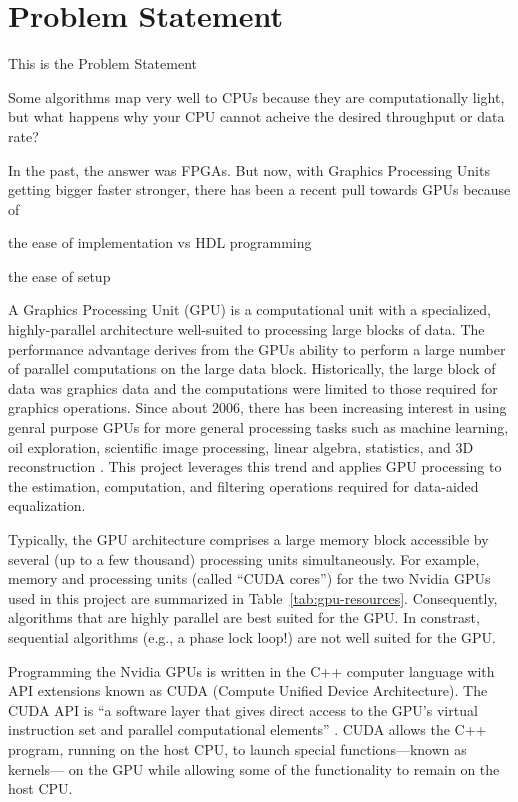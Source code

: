 \chapter{Problem Statement}
This is the Problem Statement

Some algorithms map very well to CPUs because they are computationally light,
but what happens why your CPU cannot acheive the desired throughput or data rate?

In the past, the answer was FPGAs. But now, with Graphics Processing Units getting bigger faster stronger, there has been a recent pull towards GPUs because of

the ease of implementation vs HDL programming

the ease of setup


A Graphics Processing Unit (GPU) is a computational unit with a specialized, highly-parallel architecture well-suited to processing large blocks of data.
The performance advantage derives from the GPUs ability to perform a large number of parallel computations on the large data block.
Historically, the large block of data was graphics data and the computations were limited to those required for graphics operations.
Since about 2006, there has been increasing interest in using genral purpose GPUs for more general processing tasks such as machine learning, oil exploration, scientific image processing, linear algebra, statistics, and 3D reconstruction \cite{wikipedia-gpu:2015}.
This project leverages this trend and applies GPU processing to the estimation, computation, and filtering operations required for data-aided equalization.

Typically, the GPU architecture comprises a large memory block accessible by several (up to a few thousand) processing units simultaneously.
For example, memory and processing units (called ``CUDA cores'') for the two Nvidia GPUs used in this project are summarized in Table~\ref{tab:gpu-resources}.
Consequently, algorithms that are highly parallel are best suited for the GPU.
In constrast, sequential algorithms (e.g., a phase lock loop!) are not well suited for the GPU.

Programming the Nvidia GPUs is written in the C++ computer language with API extensions known as CUDA (Compute Unified Device Architecture).
The CUDA API is ``a software layer that gives direct access to the GPU's virtual instruction set and parallel computational elements'' \cite{wikipedia-cuda:2015}.
CUDA allows the C++ program, running on the host CPU, to launch special functions---known as kernels--- on the GPU while allowing some of the functionality to remain on the host CPU.

